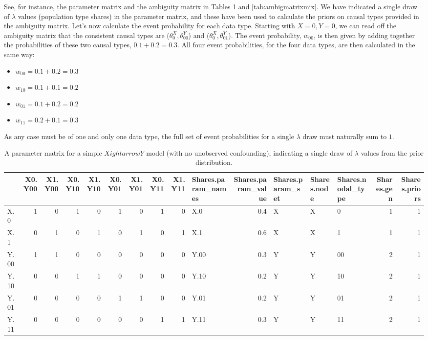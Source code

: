 \documentclass[12pt,]{book}
\providecommand{\tightlist}{%
  \setlength{\itemsep}{0pt}\setlength{\parskip}{0pt}}
\begin{document}
See, for instance, the parameter matrix and the ambiguity matrix in Tables \ref{tab:parammmatrixmix} and \ref{tab:ambigmatrixmix}. We have indicated a single draw of \(\lambda\) values (population type shares) in the parameter matrix, and these have been used to calculate the priors on causal types provided in the ambiguity matrix. Let's now calculate the event probability for each data type. Starting with \(X=0, Y=0\), we can read off the ambiguity matrix that the consistent causal types are (\(\theta^X_0, \theta^Y_{00}\)) and (\(\theta^X_0, \theta^Y_{01}\)). The event probability, \(w_{00}\), is then given by adding together the probabilities of these two causal types, \(0.1 + 0.2 = 0.3\). All four event probabilities, for the four data types, are then calculated in the same way:

\begin{itemize}
\tightlist
\item
  \(w_{00} = 0.1 + 0.2 = 0.3\)
\item
  \(w_{10} = 0.1 + 0.1 = 0.2\)
\item
  \(w_{01} = 0.1 + 0.2 = 0.2\)
\item
  \(w_{11} = 0.2 + 0.1 = 0.3\)
\end{itemize}

As any case must be of one and only one data type, the full set of event probabilities for a single \(\lambda\) draw must naturally sum to \(1\).

\begin{table}[t]

\caption{\label{tab:parammmatrixmix}A parameter matrix for a simple $X 
ightarrow Y$ model (with no unobserved confounding), indicating a single draw of $\lambda$ values from the prior distribution.}
\centering
\begin{tabular}{l|r|r|r|r|r|r|r|r|l|r|l|l|l|r|r}
\hline
  & X0.Y00 & X1.Y00 & X0.Y10 & X1.Y10 & X0.Y01 & X1.Y01 & X0.Y11 & X1.Y11 & Shares.param\_names & Shares.param\_value & Shares.param\_set & Shares.node & Shares.nodal\_type & Shares.gen & Shares.priors\\
\hline
X.0 & 1 & 0 & 1 & 0 & 1 & 0 & 1 & 0 & X.0 & 0.4 & X & X & 0 & 1 & 1\\
\hline
X.1 & 0 & 1 & 0 & 1 & 0 & 1 & 0 & 1 & X.1 & 0.6 & X & X & 1 & 1 & 1\\
\hline
Y.00 & 1 & 1 & 0 & 0 & 0 & 0 & 0 & 0 & Y.00 & 0.3 & Y & Y & 00 & 2 & 1\\
\hline
Y.10 & 0 & 0 & 1 & 1 & 0 & 0 & 0 & 0 & Y.10 & 0.2 & Y & Y & 10 & 2 & 1\\
\hline
Y.01 & 0 & 0 & 0 & 0 & 1 & 1 & 0 & 0 & Y.01 & 0.2 & Y & Y & 01 & 2 & 1\\
\hline
Y.11 & 0 & 0 & 0 & 0 & 0 & 0 & 1 & 1 & Y.11 & 0.3 & Y & Y & 11 & 2 & 1\\
\hline
\end{tabular}
\end{table}
\end{document}
